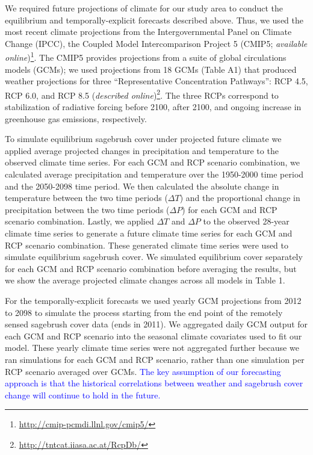 \documentclass[12pt,]{article}
\let\rmarkdownfootnote\footnote%
\def\footnote{\protect\rmarkdownfootnote}
\begin{document}
We required future projections of climate for our study area to conduct
the equilibrium and temporally-explicit forecasts described above. Thus,
we used the most recent climate projections from the Intergovernmental
Panel on Climate Change (IPCC), the Coupled Model Intercomparison
Project 5 (CMIP5; \emph{available online})\footnote{\url{http://cmip-pcmdi.llnl.gov/cmip5/}}.
The CMIP5 provides projections from a suite of global circulations
models (GCMs); we used projections from 18 GCMs (Table A1) that produced
weather projections for three ``Representative Concentration Pathways'':
RCP 4.5, RCP 6.0, and RCP 8.5 (\emph{described online})\footnote{\url{http://tntcat.iiasa.ac.at/RcpDb/}}.
The three RCPs correspond to stabilization of radiative forcing before
2100, after 2100, and ongoing increase in greenhouse gas emissions,
respectively.

To simulate equilibrium sagebrush cover under projected future climate
we applied average projected changes in precipitation and temperature to
the observed climate time series. For each GCM and RCP scenario
combination, we calculated average precipitation and temperature over
the 1950-2000 time period and the 2050-2098 time period. We then
calculated the absolute change in temperature between the two time
periods (\(\Delta T\)) and the proportional change in precipitation
between the two time periods (\(\Delta P\)) for each GCM and RCP
scenario combination. Lastly, we applied \(\Delta T\) and \(\Delta P\)
to the observed 28-year climate time series to generate a future climate
time series for each GCM and RCP scenario combination. These generated
climate time series were used to simulate equilibrium sagebrush cover.
We simulated equilibrium cover separately for each GCM and RCP scenario
combination before averaging the results, but we show the average
projected climate changes across all models in Table 1.

For the temporally-explicit forecasts we used yearly GCM projections
from 2012 to 2098 to simulate the process starting from the end point of
the remotely sensed sagebrush cover data (ends in 2011). We aggregated
daily GCM output for each GCM and RCP scenario into the seasonal climate
covariates used to fit our model. These yearly climate time series were
not aggregated further because we ran simulations for each GCM and RCP
scenario, rather than one simulation per RCP scenario averaged over
GCMs.
\textcolor{blue}{The key assumption of our forecasting approach is that the historical correlations between weather and sagebrush cover change will continue to hold in the future.}
\end{document}
